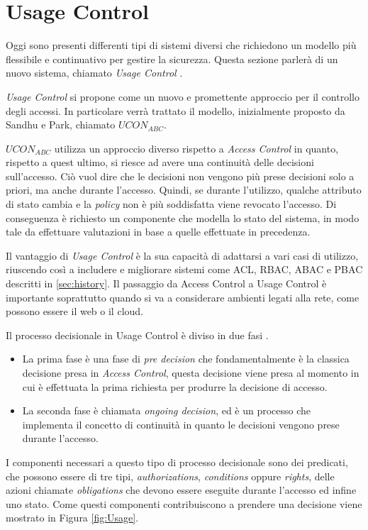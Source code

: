 \section{Usage Control} %
\label{sec:usage_control}
Oggi sono presenti differenti tipi di sistemi diversi che richiedono un modello più flessibile e continuativo per gestire la sicurezza. Questa sezione parlerà di un nuovo sistema, chiamato \textit{Usage Control} \cite{SurveyUsageControl}. \par
\textit{Usage Control} si propone come un nuovo e promettente approccio per il controllo degli accessi. In particolare verrà trattato il modello, inizialmente proposto da Sandhu e Park\cite{SurveyUsageControl}, chiamato $UCON_{ABC}$. \par
$UCON_{ABC}$ utilizza un approccio diverso rispetto a \textit{Access Control} in quanto, rispetto a quest ultimo, si riesce ad avere una continuità delle decisioni sull'accesso. Ciò vuol dire che le decisioni non vengono più prese decisioni solo a priori, ma anche durante l'accesso.  Quindi, se durante l'utilizzo, qualche attributo di stato cambia e la \textit{policy} non è più soddisfatta viene revocato l'accesso. Di conseguenza è richiesto un componente che modella lo stato del sistema, in modo tale da effettuare valutazioni in base a quelle effettuate in precedenza. \par
Il vantaggio di \textit{Usage Control} è la sua capacità di adattarsi a vari casi di utilizzo, riuscendo così a includere e migliorare sistemi come \ac{ACL}, \ac{RBAC}, \ac{ABAC} e \ac{PBAC} descritti in \ref{sec:history}.
Il passaggio da Access Control a Usage Control è importante soprattutto quando si va a considerare ambienti legati alla rete, come possono essere il web o il cloud. \par
Il processo decisionale in Usage Control è diviso in due fasi \cite{UsageControlCloud}. 
\begin{itemize}
\item La prima fase è una fase di \textit{pre decision} che fondamentalmente è la classica decisione presa in \textit{Access Control}, questa decisione viene presa al momento in cui è effettuata la prima richiesta per produrre la decisione di accesso.
\item La seconda fase è chiamata \textit{ongoing decision}, ed è un processo che implementa il concetto di continuità in quanto le decisioni vengono prese durante l'accesso.\par
\end{itemize}
I componenti necessari a questo tipo di processo decisionale sono dei predicati, che possono essere di tre tipi, \textit{authorizations}, \textit{conditions} oppure \textit{rights}, delle azioni chiamate \textit{obligations} che devono essere eseguite durante l'accesso ed infine uno stato. 
 Come questi componenti contribuiscono a prendere una decisione viene mostrato in Figura \ref{fig:Usage}.

